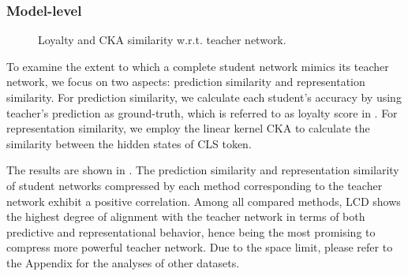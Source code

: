 \subsubsection{Model-level}
\begin{figure}[htb]
\centering
    \caption{Loyalty and CKA similarity w.r.t. teacher network.}
    \label{fig:analysis_2}
\end{figure}

To examine the extent to which a complete student network mimics its teacher network, we focus on two aspects: prediction similarity and representation similarity. 
For prediction similarity, we calculate each student's accuracy by using teacher's prediction as ground-truth, which is referred to as loyalty score in \cite{byd} . For representation similarity, we employ the linear kernel CKA to calculate the similarity between the hidden states of CLS token.


The results are shown in . The prediction similarity and representation similarity of student networks compressed by each method corresponding to the teacher network exhibit a positive correlation. Among all compared methods, LCD shows the highest degree of alignment with the teacher network in terms of both predictive and representational behavior, hence being the most promising to 
compress more powerful teacher network. Due to the space limit, please refer to the Appendix for the analyses of other datasets.
